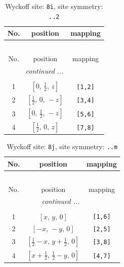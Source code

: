 \documentclass[fleqn,8pt]{jsarticle}
\begin{document}
\renewcommand{\arraystretch}{1.2}
\begin{longtable}{ccc}
\caption{Wyckoff site: {\tt 8i}, site symmetry: {\tt ..2}}
 \\
 \hline \hline
No. & position & mapping \\ \hline \endfirsthead

\multicolumn{2}{l}{\tablename\ \thetable{}} \\
 \hline \hline
No. & position & mapping \\ \hline \endhead

 \hline \hline
\multicolumn{2}{r}{\footnotesize\it continued ...} \\ \endfoot

 \hline \hline
\multicolumn{2}{r}{} \\ \endlastfoot

1 & $\left[ 0,\, \frac{1}{2},\, z \right]$ & {\tt [1,2]} \\ \hline
2 & $\left[ \frac{1}{2},\, 0,\, - z \right]$ & {\tt [3,4]} \\ \hline
3 & $\left[ 0,\, \frac{1}{2},\, - z \right]$ & {\tt [5,6]} \\ \hline
4 & $\left[ \frac{1}{2},\, 0,\, z \right]$ & {\tt [7,8]} \\
\end{longtable}
\renewcommand{\arraystretch}{1.2}
\begin{longtable}{ccc}
\caption{Wyckoff site: {\tt 8j}, site symmetry: {\tt ..m}}
 \\
 \hline \hline
No. & position & mapping \\ \hline \endfirsthead

\multicolumn{2}{l}{\tablename\ \thetable{}} \\
 \hline \hline
No. & position & mapping \\ \hline \endhead

 \hline \hline
\multicolumn{2}{r}{\footnotesize\it continued ...} \\ \endfoot

 \hline \hline
\multicolumn{2}{r}{} \\ \endlastfoot

1 & $\left[ x,\, y,\, 0 \right]$ & {\tt [1,6]} \\ \hline
2 & $\left[ - x,\, - y,\, 0 \right]$ & {\tt [2,5]} \\ \hline
3 & $\left[ \frac{1}{2} - x,\, y + \frac{1}{2},\, 0 \right]$ & {\tt [3,8]} \\ \hline
4 & $\left[ x + \frac{1}{2},\, \frac{1}{2} - y,\, 0 \right]$ & {\tt [4,7]} \\
\end{longtable}
\end{document}
